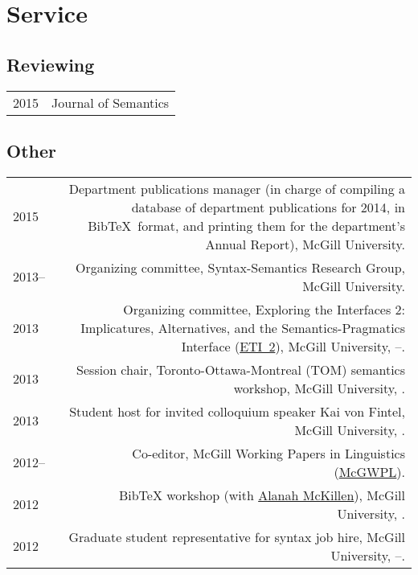 \documentclass[a4paper]{article}
\makeatletter
\newcommand{\formatdatenoday}[2]{\mydatenoday\formatdate{0}{#1}{#2}}
\newcommand{\myvrule}{\color{lightgray}\vrule width 1.0pt}
\newenvironment{cvsection}{%
  \renewcommand{\arraystretch}{1.75}
  \begin{longtable}[l]{@{} L R @{}}
}{%
  \end{longtable}
}
\makeatother
\begin{document}
\section*{Service}

\subsection*{Reviewing}

\begin{cvsection}
  2015 & Journal of Semantics
\end{cvsection}

\subsection*{Other}

\begin{cvsection}
  2015 & Department publications manager (in charge of compiling a database of
  department publications for 2014, in Bib\TeX\ format, and printing them for
  the department's Annual Report), McGill University. \\

  2013-- & Organizing committee, Syntax-Semantics Research Group, McGill
  University. \\

  2013 & Organizing committee, Exploring the Interfaces 2: Implicatures,
  Alternatives, and the Semantics-Pragmatics Interface
  (\href{https://sites.google.com/site/eti2pragmatics/}{ETI~2}), McGill
  University, \shortmonthname[4]--\formatdatenoday{6}{2013}. \\

  2013 & Session chair, Toronto-Ottawa-Montreal (TOM) semantics workshop,
  McGill University, . \\

  2013 & Student host for invited colloquium speaker Kai von Fintel, McGill
  University, \formatdatenoday{1}{2013}. \\

  2012-- & Co-editor, McGill Working Papers in Linguistics
  (\href{http://www.mcgill.ca/mcgwpl/}{McGWPL}). \\

  2012 & Bib\TeX{} workshop (with
  \href{http://people.linguistics.mcgill.ca/~alanah.mckillen/}{Alanah
  McKillen}), McGill University, . \\

  2012 & Graduate student representative for syntax job hire, McGill
  University, \shortmonthname[5]--\formatdatenoday{6}{2012}. \\


\end{cvsection}
\end{document}

